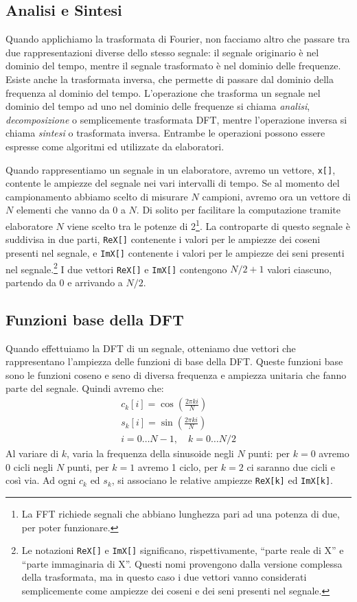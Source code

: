 \subsection{Analisi e Sintesi}
\label{analisi_sintesi}
Quando applichiamo la trasformata di Fourier, non facciamo altro che passare tra
due rappresentazioni diverse dello stesso segnale: il segnale originario \`e nel
dominio del tempo, mentre il segnale trasformato \`e nel dominio delle
frequenze. Esiste anche la trasformata inversa, che permette di passare dal
dominio della frequenza al dominio del tempo.
L'operazione che trasforma un segnale nel dominio del tempo ad uno nel dominio
delle frequenze si chiama \emph{analisi}, \emph{decomposizione} o semplicemente
{trasformata DFT}, mentre l'operazione inversa si chiama \emph{sintesi} o
{trasformata inversa}. Entrambe le operazioni possono essere espresse come
algoritmi ed utilizzate da elaboratori.

Quando rappresentiamo un segnale in un elaboratore, avremo un vettore,
\texttt{x[]}, contente le ampiezze del segnale nei vari intervalli di tempo. Se
al momento del campionamento abbiamo scelto di misurare $N$ campioni, avremo ora
un vettore di $N$ elementi che vanno da 0 a $N$. Di solito per facilitare la
computazione tramite elaboratore $N$ viene scelto tra le potenze di
2\footnote{La \ac{FFT} richiede segnali che abbiano lunghezza pari ad una potenza di
due, per poter funzionare.}. La controparte di questo segnale \`e suddivisa in
due parti, \texttt{ReX[]} contenente i valori per le ampiezze dei coseni
presenti nel segnale, e \texttt{ImX[]} contenente i valori per le ampiezze dei
seni presenti nel segnale.\footnote{Le notazioni \texttt{ReX[]} e \texttt{ImX[]}
significano, rispettivamente, ``parte reale di X'' e ``parte immaginaria di X''.
Questi nomi provengono dalla versione complessa della trasformata, ma in questo
caso i due vettori vanno considerati semplicemente come ampiezze dei coseni e
dei seni presenti nel segnale.} I due vettori \texttt{ReX[]} e \texttt{ImX[]}
contengono $N/2 + 1$ valori ciascuno, partendo da 0 e arrivando a $N/2$.

\subsection{Funzioni base della DFT}
Quando effettuiamo la DFT di un segnale, otteniamo due vettori che rappresentano
l'ampiezza delle funzioni di base della DFT. Queste funzioni base sono le
funzioni coseno e seno di diversa frequenza e ampiezza unitaria che fanno parte
del segnale. Quindi avremo che:
\[
\begin{array}{c}
c_k[i] = \cos\left(\frac{2\pi ki}{N}\right)\\[0.5em]
s_k[i] = \sin\left(\frac{2\pi ki}{N}\right)\\[0.5em]
i = 0\dots N-1, \quad k = 0 \dots N/2
\end{array}
\]
Al variare di $k$, varia la frequenza della sinusoide negli $N$ punti: per $k =
0$ avremo $0$ cicli negli $N$ punti, per $k=1$ avremo 1 ciclo, per $k=2$ ci
saranno due cicli e cos\`i via. Ad ogni $c_k$ ed $s_k$, si associano le relative
ampiezze \texttt{ReX[k]} ed \texttt{ImX[k]}.

